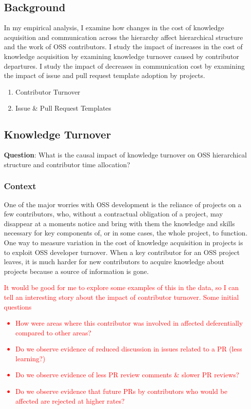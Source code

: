 \documentclass[source/paper/main.tex]{subfiles}
\begin{document}
\subsection{Background}
In my empirical analysis, I examine how changes in the cost of knowledge acquisition and communication across the hierarchy affect hierarchical structure and the work of OSS contributors. I study the impact of increases in the cost of knowledge acquisition by examining knowledge turnover caused by contributor departures. I study the impact of decreases in communication cost by examining the impact of issue and pull request template adoption by projects. 

\begin{enumerate}
    \item Contributor Turnover
    \item Issue \& Pull Request Templates
\end{enumerate}

\subsection{Knowledge Turnover}
\textbf{Question}: What is the causal impact of knowledge turnover on OSS hierarchical structure and contributor time allocation? 

\subsubsection{Context}
One of the major worries with OSS development is the reliance of projects on a few contributors, who, without a contractual obligation of a project, may disappear at a moments notice and bring with them the knowledge and skills necessary for key components of, or in some cases, the whole project, to function. One way to measure variation in the cost of knowledge acquisition in projects is to exploit OSS developer turnover. When a key contributor for an OSS project leaves, it is much harder for new contributors to acquire knowledge about projects because a source of information is gone.\\
\textcolor{red}{It would be good for me to explore some examples of this in the data, so I can tell an interesting story about the impact of contributor turnover. Some initial questions
\begin{itemize}
    \item How were areas where this contributor was involved in affected deferentially compared to other areas?
    \item Do we observe evidence of reduced discussion in issues related to a PR (less learning?)
    \item Do we observe evidence of less PR review comments \& slower PR reviews?
    \item Do we observe evidence that future PRs by contributors who would be affected are rejected at higher rates?
\end{itemize}
}
\end{document}
